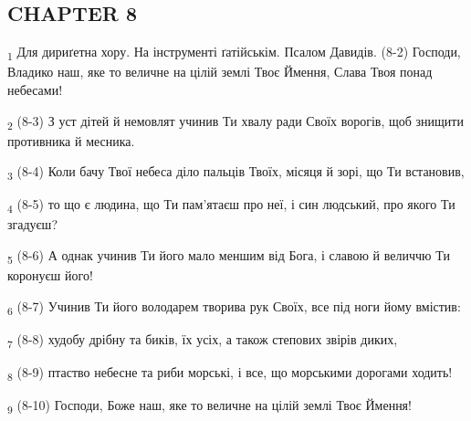 \subsection{CHAPTER 8}
\begin{tcolorbox}
\textsubscript{1} Для дириґетна хору. На інструменті ґатійськім. Псалом Давидів. (8-2) Господи, Владико наш, яке то величне на цілій землі Твоє Ймення, Слава Твоя понад небесами!
\end{tcolorbox}
\begin{tcolorbox}
\textsubscript{2} (8-3) З уст дітей й немовлят учинив Ти хвалу ради Своїх ворогів, щоб знищити противника й месника.
\end{tcolorbox}
\begin{tcolorbox}
\textsubscript{3} (8-4) Коли бачу Твої небеса діло пальців Твоїх, місяця й зорі, що Ти встановив,
\end{tcolorbox}
\begin{tcolorbox}
\textsubscript{4} (8-5) то що є людина, що Ти пам'ятаєш про неї, і син людський, про якого Ти згадуєш?
\end{tcolorbox}
\begin{tcolorbox}
\textsubscript{5} (8-6) А однак учинив Ти його мало меншим від Бога, і славою й величчю Ти коронуєш його!
\end{tcolorbox}
\begin{tcolorbox}
\textsubscript{6} (8-7) Учинив Ти його володарем творива рук Своїх, все під ноги йому вмістив:
\end{tcolorbox}
\begin{tcolorbox}
\textsubscript{7} (8-8) худобу дрібну та биків, їх усіх, а також степових звірів диких,
\end{tcolorbox}
\begin{tcolorbox}
\textsubscript{8} (8-9) птаство небесне та риби морські, і все, що морськими дорогами ходить!
\end{tcolorbox}
\begin{tcolorbox}
\textsubscript{9} (8-10) Господи, Боже наш, яке то величне на цілій землі Твоє Ймення!
\end{tcolorbox}
